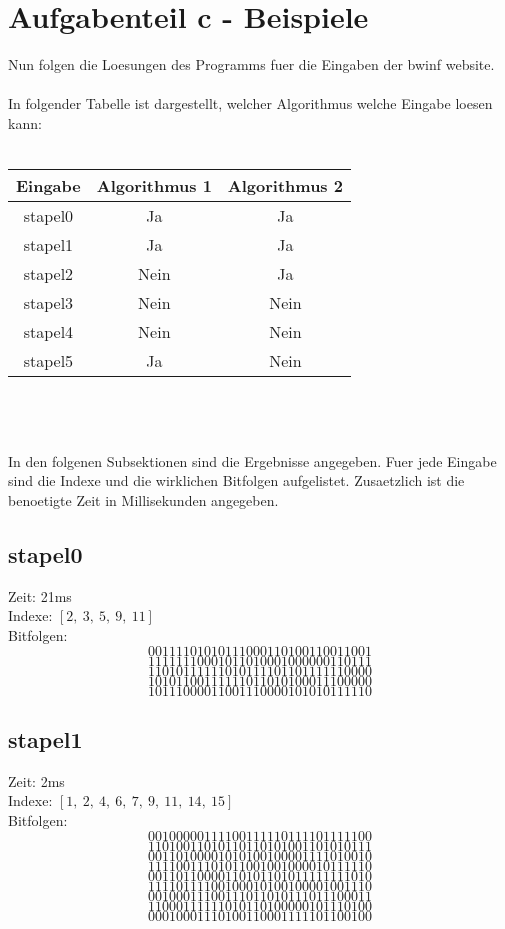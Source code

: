 \documentclass[a4paper,10pt,ngerman]{scrartcl}
\begin{document}
{\section{Aufgabenteil c - Beispiele}
Nun folgen die Loesungen des Programms fuer die Eingaben der bwinf website.\\
\\
In folgender Tabelle ist dargestellt, welcher Algorithmus welche Eingabe loesen kann:\\
\\
\begin{tabular}[c]{c|c|c}
Eingabe & Algorithmus 1 & Algorithmus 2 \\
\hline
stapel0 & Ja & Ja \\
stapel1 & Ja & Ja \\ 
stapel2 & Nein & Ja \\
stapel3 & Nein & Nein \\
stapel4 & Nein & Nein \\
stapel5 & Ja & Nein \\
\end{tabular}
\\\\\\
In den folgenen Subsektionen sind die Ergebnisse angegeben. Fuer jede Eingabe sind die Indexe und die wirklichen Bitfolgen aufgelistet. Zusaetzlich ist die benoetigte Zeit in Millisekunden angegeben.

\subsection{stapel0}
Zeit: 21ms\\
Indexe: $[2, \ 3, \ 5, \ 9, \ 11]$ \\
Bitfolgen:
$$
00111101010111000110100110011001
$$
$$
11111110001011010001000000110111
$$
$$
11010111111010111101101111110000
$$
$$
10101100111111011010100011100000
$$
$$
10111000011001110000101010111110
$$

\subsection{stapel1}
Zeit: 2ms \\
Indexe: $[1, \ 2,\  4, \ 6, \ 7, \ 9, \ 11, \ 14, \ 15]$ \\
Bitfolgen:
$$
00100000111100111110111101111100
$$
$$
11010011010110110101001101010111
$$
$$
00110100001010100100001111010010
$$
$$
11110011101011001001000010111110
$$
$$
00110110000110101101011111111010
$$
$$
11110111100100010100100001001110
$$
$$
00100011100111011010111011100011
$$
$$
11000111111010110100000101110100
$$
$$
00010001110100110001111101100100
$$

}
\end{document}
